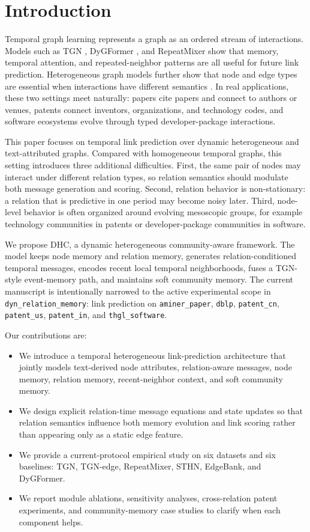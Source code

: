 \documentclass[runningheads]{llncs}
\begin{document}
\section{Introduction}
Temporal graph learning represents a graph as an ordered stream of interactions. Models such as TGN \cite{rossi2020tgn}, DyGFormer \cite{yu2023dygformer}, and RepeatMixer \cite{zou2024repeatmixer} show that memory, temporal attention, and repeated-neighbor patterns are all useful for future link prediction. Heterogeneous graph models further show that node and edge types are essential when interactions have different semantics \cite{wang2019han,hu2020hgt}. In real applications, these two settings meet naturally: papers cite papers and connect to authors or venues, patents connect inventors, organizations, and technology codes, and software ecosystems evolve through typed developer-package interactions.

This paper focuses on temporal link prediction over dynamic heterogeneous and text-attributed graphs. Compared with homogeneous temporal graphs, this setting introduces three additional difficulties. First, the same pair of nodes may interact under different relation types, so relation semantics should modulate both message generation and scoring. Second, relation behavior is non-stationary: a relation that is predictive in one period may become noisy later. Third, node-level behavior is often organized around evolving mesoscopic groups, for example technology communities in patents or developer-package communities in software.

We propose DHC, a dynamic heterogeneous community-aware framework. The model keeps node memory and relation memory, generates relation-conditioned temporal messages, encodes recent local temporal neighborhoods, fuses a TGN-style event-memory path, and maintains soft community memory. The current manuscript is intentionally narrowed to the active experimental scope in \texttt{dyn\_relation\_memory}: link prediction on \texttt{aminer\_paper}, \texttt{dblp}, \texttt{patent\_cn}, \texttt{patent\_us}, \texttt{patent\_in}, and \texttt{thgl\_software}.

Our contributions are:
\begin{itemize}
\item We introduce a temporal heterogeneous link-prediction architecture that jointly models text-derived node attributes, relation-aware messages, node memory, relation memory, recent-neighbor context, and soft community memory.
\item We design explicit relation-time message equations and state updates so that relation semantics influence both memory evolution and link scoring rather than appearing only as a static edge feature.
\item We provide a current-protocol empirical study on six datasets and six baselines: TGN, TGN-edge, RepeatMixer, STHN, EdgeBank, and DyGFormer.
\item We report module ablations, sensitivity analyses, cross-relation patent experiments, and community-memory case studies to clarify when each component helps.
\end{itemize}
\end{document}
